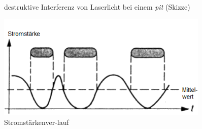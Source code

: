 \begin{figure}[h]
\begin{center}
\begin{minipage}[t]{0.3\textwidth}
\begin{center}
                \caption[destruktive Interferenz von Laserlicht bei einem \textit{pit} (Skizze) \newline \url{http://www.muenster.de/~asshoff/physik/cd/image50.gif} (zuletzt aufgerufen am 07.08.2015)]{destruktive Interferenz von Laserlicht bei einem \textit{pit} (Skizze)}
                \label{fig:cdlaser}
            \end{center}
        \end{minipage}
        \hspace{0.025\textwidth}
        \begin{minipage}[t]{0.3\textwidth}
            \begin{center}
                \includegraphics[width=0.9\textwidth]{Bilder/Optische_Datentraeger_Die_Compact_Disc/Funktionsweise/cdstrom.png}
                \caption[Stromstärkenverlauf \newline \url{http://www.muenster.de/~asshoff/physik/cd/image51.gif} (zuletzt aufgerufen am 07.08.2015)]{Stromstärkenver-lauf}
                \label{fig:cdstrom}
            \end{center}
        \end{minipage}
    \end{center}
\end{figure}

